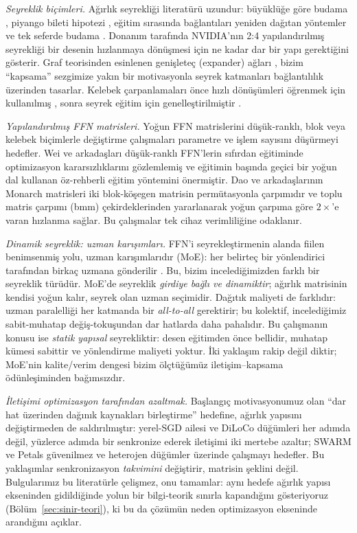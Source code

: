 \documentclass[10pt,journal]{IEEEtran}
\begin{document}
\emph{Seyreklik biçimleri.} Ağırlık seyrekliği literatürü uzundur: büyüklüğe göre budama
\cite{han2015}, piyango bileti hipotezi \cite{frankle2019}, eğitim sırasında bağlantıları
yeniden dağıtan yöntemler \cite{rigl2020} ve tek seferde budama \cite{sparsegpt2023}.
Donanım tarafında NVIDIA'nın 2:4 yapılandırılmış seyrekliği \cite{nm2021} bir desenin
hızlanmaya dönüşmesi için ne kadar dar bir yapı gerektiğini gösterir. Graf teorisinden
esinlenen genişleteç (expander) ağları \cite{expander2018}, bizim ``kapsama'' sezgimize
yakın bir motivasyonla seyrek katmanları bağlantılılık üzerinden tasarlar. Kelebek
çarpanlamaları önce hızlı dönüşümleri öğrenmek için kullanılmış \cite{dao2019}, sonra
seyrek eğitim için genelleştirilmiştir \cite{pixelbutterfly2022}.

\emph{Yapılandırılmış FFN matrisleri.} Yoğun FFN matrislerini düşük-ranklı, blok veya kelebek
biçimlerle değiştirme çalışmaları parametre ve işlem sayısını düşürmeyi hedefler. Wei ve
arkadaşları \cite{wei2024} düşük-ranklı FFN'lerin sıfırdan eğitiminde optimizasyon
kararsızlıklarını gözlemlemiş ve eğitimin başında geçici bir yoğun dal kullanan öz-rehberli
eğitim yöntemini önermiştir. Dao ve arkadaşlarının Monarch matrisleri \cite{dao2022} iki
blok-köşegen matrisin permütasyonla çarpımıdır ve toplu matris çarpımı (bmm) çekirdeklerinden
yararlanarak yoğun çarpıma göre $2\times$'e varan hızlanma sağlar. Bu çalışmalar tek cihaz
verimliliğine odaklanır.

\emph{Dinamik seyreklik: uzman karışımları.} FFN'i seyrekleştirmenin alanda fiilen benimsenmiş
yolu, uzman karışımlarıdır (MoE): her belirteç bir yönlendirici tarafından birkaç uzmana
gönderilir \cite{shazeer2017,gshard2021,switch2022}. Bu, bizim incelediğimizden farklı bir
seyreklik türüdür.
MoE'de seyreklik \emph{girdiye bağlı ve dinamiktir}; ağırlık matrisinin kendisi yoğun kalır,
seyrek olan uzman seçimidir. Dağıtık maliyeti de farklıdır: uzman paralelliği her katmanda
bir \emph{all-to-all} gerektirir; bu kolektif, incelediğimiz sabit-muhatap değiş-tokuşundan
dar hatlarda daha pahalıdır. Bu çalışmanın konusu ise \emph{statik yapısal} seyrekliktir:
desen eğitimden önce bellidir, muhatap kümesi sabittir ve yönlendirme maliyeti yoktur.
İki yaklaşım rakip değil diktir; MoE'nin kalite/verim dengesi bizim ölçtüğümüz
iletişim--kapsama ödünleşiminden bağımsızdır.

\emph{İletişimi optimizasyon tarafından azaltmak.} Başlangıç motivasyonumuz olan ``dar hat
üzerinden dağınık kaynakları birleştirme'' hedefine, ağırlık yapısını değiştirmeden de
saldırılmıştır: yerel-SGD ailesi \cite{stich2019} ve DiLoCo \cite{diloco2023} düğümleri her
adımda değil, yüzlerce adımda bir senkronize ederek iletişimi iki mertebe azaltır; SWARM
\cite{swarm2023} ve Petals \cite{petals2023} güvenilmez ve heterojen düğümler üzerinde
çalışmayı hedefler. Bu yaklaşımlar senkronizasyon
\emph{takvimini} değiştirir, matrisin şeklini değil. Bulgularımız bu literatürle çelişmez,
onu tamamlar: aynı hedefe ağırlık yapısı ekseninden gidildiğinde yolun bir bilgi-teorik
sınırla kapandığını gösteriyoruz (Bölüm~\ref{sec:sinir-teori}), ki bu da çözümün neden
optimizasyon ekseninde arandığını açıklar.
\end{document}
